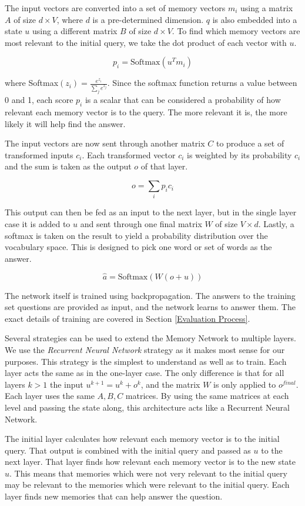 \documentclass[pageno]{jpaper}
\begin{document}
The input vectors are converted into a set of memory vectors ${m_i}$ using a
matrix $A$ of size $d\times V$, where $d$ is a pre-determined dimension. $q$ is
also embedded into a state $u$ using a different matrix $B$ of size $d\times V$.
To find which memory vectors are most relevant to the initial query, we take the
dot product of each vector with $u$.

$$p_i = \text{Softmax}(u^Tm_i)$$

where Softmax$(z_i) = \frac{e^{z_i}}{\sum_j e^{z_j}}$. Since the softmax function
returns a value between 0 and 1, each score $p_i$ is a scalar that can be considered
a probability of how relevant each memory vector is to the query. The more relevant
it is, the more likely it will help find the answer.

The input vectors are now sent through another matrix $C$ to produce a set of
transformed inputs ${c_i}$. Each transformed vector $c_i$ is weighted by its
probability $c_i$ and the sum is taken as the output $o$ of that layer.

$$o = \sum_i p_i c_i$$

This output can then be fed as an input to the next layer, but in the single
layer case it is added to $u$ and sent through one final matrix $W$ of size
$V\times d$. Lastly, a softmax is taken on the result to yield a probability
distribution over the vocabulary space. This is designed to pick one word
or set of words as the answer.

$$\hat{a} = \text{Softmax}\left(W\left(o + u\right)\right)$$

The network itself is trained using backpropagation. The answers to the training
set questions are provided as input, and the network learns to answer them. The
exact details of training are covered in Section \ref{Evaluation Process}.

Several strategies can be used to extend the Memory Network to multiple layers.
We use the \textit{Recurrent Neural Network} strategy as it makes most sense for
our purposes. This strategy is the simplest to understand as well as to train.
Each layer acts the same as in the one-layer case. The only difference is that
for all layers $k > 1$ the input $u^{k+1} = u^k + o^k$, and the matrix $W$ is
only applied to $o^{final}$. Each layer uses the same $A,B,C$ matrices. By using
the same matrices at each level and passing the state along, this architecture
acts like a Recurrent Neural Network.

The initial layer calculates how relevant each memory vector is to the initial
query. That output is combined with the initial query and passed as $u$ to the
next layer. That layer finds how relevant each memory vector is to the new state
$u$. This means that memories which were not very relevant to the initial query
may be relevant to the memories which were relevant to the initial query. Each
layer finds new memories that can help answer the question. \\
\end{document}
